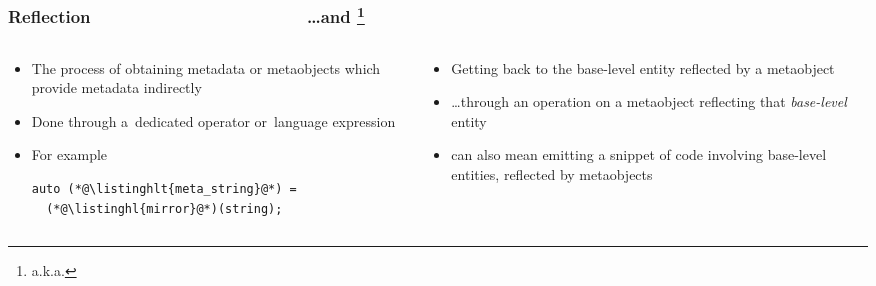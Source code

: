 \documentclass[compress,table,xcolor=table]{beamer}
\begin{document}
\begin{frame}[fragile]
  \frametitle{Reflection~~~~~~~~~~~~~~~~~~~~~~~\ldots and
  \footnote{a.k.a. }}
  \begin{columns}
    \begin{column}{.50\textwidth}
      \begin{itemize}
        \item The process of obtaining metadata or metaobjects which provide metadata
          indirectly
        \item Done through a~dedicated operator or~language expression
        \item For example
  \begin{lstlisting}[language=c++2x,basicstyle=\footnotesize\ttfamily]
auto (*@\listinghlt{meta_string}@*) =
  (*@\listinghl{mirror}@*)(string);
  \end{lstlisting}
      \end{itemize}
    \end{column}
    \begin{column}{.50\textwidth}
      \begin{itemize}
        \item Getting back to the base-level entity reflected by a metaobject
        \item \ldots through an operation on a metaobject reflecting that
          {\em base-level} entity
        \item {} can also mean emitting a snippet of code involving
          base-level entities, reflected by metaobjects
      \end{itemize}
    \end{column}
  \end{columns}
\end{frame}
\end{document}
